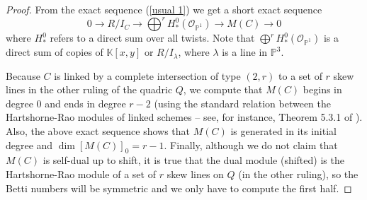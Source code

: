 \documentclass[12pt]{amsart}%
\numberwithin{equation}{section}
\theoremstyle{definition}
\numberwithin{equation}{section}
\newcommand{\PP}{ \ensuremath{\mathbb{P}}}
\begin{document}
\begin{proof}
    From the exact sequence (\ref{usual 1}) we get a short exact sequence
    \[
    0 \rightarrow R/I_C \rightarrow \bigoplus^r H^0_*(\mathcal O_{\PP^1}) \rightarrow M(C) \rightarrow 0
    \]
    where $H^0_*$ refers to a direct sum over all twists. Note that $\bigoplus^r H^0_*(\mathcal O_{\PP^1})$ is a direct sum of copies of $\mathbb K[x,y]$ or $R/I_\lambda$, where $\lambda$ is a line in $\PP^3$.

    Because $C$ is linked by a complete intersection of type $(2,r)$ to a set of $r$ skew lines in the other ruling of the quadric $Q$, we compute that $M(C)$ begins in degree 0 and ends in degree $r-2$ (using the standard relation between the Hartshorne-Rao modules of linked schemes -- see, for instance, Theorem 5.3.1 of \cite{MBook}). Also, the above exact sequence shows that $M(C)$ is generated in its initial degree and $\dim [M(C)]_0 = r-1$. Finally, although we do not claim that $M(C)$ is self-dual up to shift, it is true that the dual module (shifted) is the Hartshorne-Rao module of a set of $r$ skew lines on $Q$ (in the other ruling), so the Betti numbers will be symmetric and we only have to compute the first half.


\end{proof}
\end{document}
